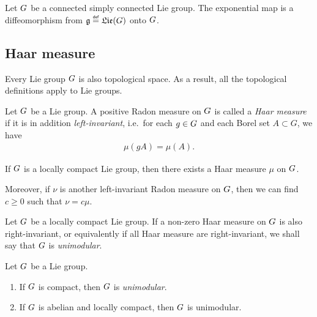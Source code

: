 \begin{proposition}
    Let $G$ be a connected simply connected Lie group.
    The exponential map is a diffeomorphism from $\LieAlgebra \defeq \Lie(\Group)$ onto $G$.
\end{proposition}

\subsection{Haar measure}

\begin{remark}
    Every Lie group $G$ is also topological space.
    As a result, all the topological definitions apply to Lie groups.
\end{remark}

\begin{definition}
    Let $G$ be a Lie group.
    A positive Radon measure on $G$ is called a \emph{Haar measure}
    if it is in addition \emph{left-invariant},
    i.e.\ for each $g \in G$ and each Borel set $A \subset G$, we have
    \begin{align*}
        \mu(g A) = \mu(A).
    \end{align*}
\end{definition}

\begin{proposition}
    If $G$ is a locally compact Lie group,
    then there exists a Haar measure $\mu$ on $G$.

    Moreover, if $\nu$ is another left-invariant Radon measure on $G$,
    then we can find $c \geq 0$ such that $\nu = c \mu$.
\end{proposition}

\begin{definition}
\label{definition:unimodular_group}
    Let $G$ be a locally compact Lie group.
    If a non-zero Haar measure on $G$ is also right-invariant,
    or equivalently if all Haar measure are right-invariant,
    we shall say that $G$ is \emph{unimodular}.
\end{definition}

\begin{proposition}
\label{proposition:sufficient_conditions_to_be_unimodular}
    Let $G$ be a Lie group.
    \begin{enumerate}
        \item If $G$ is compact, then $G$ is \emph{unimodular}.
        \item If $G$ is abelian and locally compact, then $G$ is unimodular.
    \end{enumerate}
\end{proposition}

